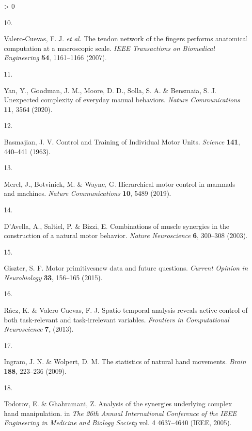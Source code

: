 \documentclass[
  a4paper,
]{article}
\newlength{\cslhangindent}
\newlength{\csllabelwidth}
\newenvironment{CSLReferences}[2] %
 {%
  \setlength{\parindent}{0pt}
  \ifodd #1 \everypar{\setlength{\hangindent}{\cslhangindent}}\ignorespaces\fi
  \ifnum #2 > 0
  \setlength{\parskip}{#2\baselineskip}
  \fi
 }%
 {}
\newcommand{\CSLLeftMargin}[1]{\parbox[t]{\csllabelwidth}{#1}}
\newcommand{\CSLRightInline}[1]{\parbox[t]{\linewidth - \csllabelwidth}{#1}\break}
\begin{document}
\begin{CSLReferences}{0}{0}
\leavevmode\hypertarget{ref-Valero-Cuevas2007}{}%
\CSLLeftMargin{10. }
\CSLRightInline{Valero-Cuevas, F. J. \emph{et al.} The tendon network of
the fingers performs anatomical computation at a macroscopic scale.
\emph{IEEE Transactions on Biomedical Engineering} \textbf{54},
1161--1166 (2007).}

\leavevmode\hypertarget{ref-yanUnexpectedComplexityEveryday2020}{}%
\CSLLeftMargin{11. }
\CSLRightInline{Yan, Y., Goodman, J. M., Moore, D. D., Solla, S. A. \&
Bensmaia, S. J. Unexpected complexity of everyday manual behaviors.
\emph{Nature Communications} \textbf{11}, 3564 (2020).}

\leavevmode\hypertarget{ref-Basmajian1963}{}%
\CSLLeftMargin{12. }
\CSLRightInline{Basmajian, J. V. Control and {Training} of {Individual
Motor Units}. \emph{Science} \textbf{141}, 440--441 (1963).}

\leavevmode\hypertarget{ref-merelHierarchicalMotorControl2019}{}%
\CSLLeftMargin{13. }
\CSLRightInline{Merel, J., Botvinick, M. \& Wayne, G. Hierarchical motor
control in mammals and machines. \emph{Nature Communications}
\textbf{10}, 5489 (2019).}

\leavevmode\hypertarget{ref-DAvella2003}{}%
\CSLLeftMargin{14. }
\CSLRightInline{D'Avella, A., Saltiel, P. \& Bizzi, E. Combinations of
muscle synergies in the construction of a natural motor behavior.
\emph{Nature Neuroscience} \textbf{6}, 300--308 (2003).}

\leavevmode\hypertarget{ref-giszterMotorPrimitivesNew2015}{}%
\CSLLeftMargin{15. }
\CSLRightInline{Giszter, S. F. Motor primitives{}new data and future
questions. \emph{Current Opinion in Neurobiology} \textbf{33}, 156--165
(2015).}

\leavevmode\hypertarget{ref-raczSpatiotemporalAnalysisReveals2013}{}%
\CSLLeftMargin{16. }
\CSLRightInline{Rácz, K. \& Valero-Cuevas, F. J. Spatio-temporal
analysis reveals active control of both task-relevant and
task-irrelevant variables. \emph{Frontiers in Computational
Neuroscience} \textbf{7}, (2013).}

\leavevmode\hypertarget{ref-Ingram2009}{}%
\CSLLeftMargin{17. }
\CSLRightInline{Ingram, J. N. \& Wolpert, D. M. The statistics of
natural hand movements. \emph{Brain} \textbf{188}, 223--236 (2009).}

\leavevmode\hypertarget{ref-TodorovDimensionality2005}{}%
\CSLLeftMargin{18. }
\CSLRightInline{Todorov, E. \& Ghahramani, Z. Analysis of the synergies
underlying complex hand manipulation. in \emph{The 26th {Annual
International Conference} of the {IEEE Engineering} in {Medicine} and
{Biology Society}} vol. 4 4637--4640 ({IEEE}, 2005).}


\end{CSLReferences}
\end{document}
